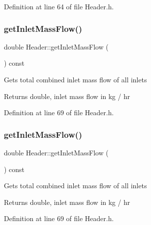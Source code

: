 Definition at line 64 of file Header.\+h.

\mbox{\label{class_header_ad572e6144481b9e9f65004aacebd701c}} 
\subsubsection{\texorpdfstring{get\+Inlet\+Mass\+Flow()}{getInletMassFlow()}\hspace{0.1cm}{\footnotesize\ttfamily [1/3]}}
{\footnotesize\ttfamily double Header\+::get\+Inlet\+Mass\+Flow (\begin{DoxyParamCaption}{ }\end{DoxyParamCaption}) const\hspace{0.3cm}{\ttfamily [inline]}}

Gets total combined inlet mass flow of all inlets \begin{DoxyReturn}{Returns}
double, inlet mass flow in kg / hr 
\end{DoxyReturn}


Definition at line 69 of file Header.\+h.

\mbox{\label{class_header_ad572e6144481b9e9f65004aacebd701c}} 
\subsubsection{\texorpdfstring{get\+Inlet\+Mass\+Flow()}{getInletMassFlow()}\hspace{0.1cm}{\footnotesize\ttfamily [2/3]}}
{\footnotesize\ttfamily double Header\+::get\+Inlet\+Mass\+Flow (\begin{DoxyParamCaption}{ }\end{DoxyParamCaption}) const\hspace{0.3cm}{\ttfamily [inline]}}

Gets total combined inlet mass flow of all inlets \begin{DoxyReturn}{Returns}
double, inlet mass flow in kg / hr 
\end{DoxyReturn}


Definition at line 69 of file Header.\+h.

\mbox{\label{class_header_ad572e6144481b9e9f65004aacebd701c}} 
